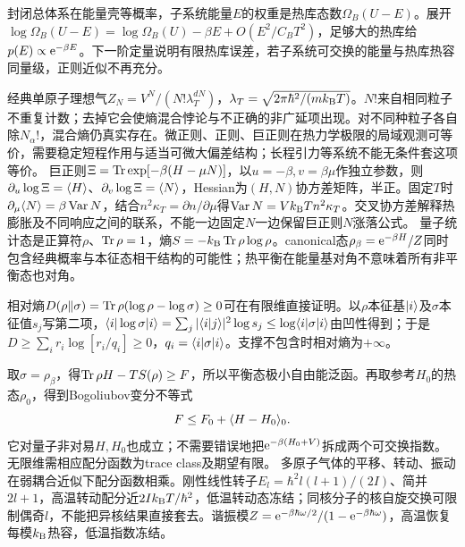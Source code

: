 \label{ch:ensemble}
封闭总体系在能量壳等概率，子系统能量$E$的权重是热库态数$\Omega_B(U-E)$。展开$\log\Omega_B(U-E)=\log\Omega_B(U)-\beta E+O(E^2/C_BT^2)$，足够大的热库给$p(E)\propto\mathrm e^{-\beta E}$。下一阶定量说明有限热库误差，若子系统可交换的能量与热库热容同量级，正则近似不再充分。

经典单原子理想气$Z_N=V^N/(N!\lambda_T^{dN})$，$\lambda_T=\sqrt{2\pi\hbar^2/(mk_{\mathrm B} T)}$。$N!$来自相同粒子不重复计数；去掉它会使熵混合悖论与不正确的非广延项出现。对不同种粒子各自除$N_\alpha!$，混合熵仍真实存在。微正则、正则、巨正则在热力学极限的局域观测可等价，需要稳定短程作用与适当可微大偏差结构；长程引力等系统不能无条件套这项等价。
巨正则$\Xi=\operatorname{Tr}\exp[-\beta(H-\mu N)]$，以$u=-\beta,v=\beta\mu$作独立参数，则$\partial_u\log\Xi=\langle H\rangle$、$\partial_v\log\Xi=\langle N\rangle$，Hessian为$(H,N)$协方差矩阵，半正。固定$T$时$\partial_\mu\langle N\rangle=\beta\operatorname{Var}N$，结合$n^2\kappa_T=\partial n/\partial\mu$得$\operatorname{Var}N=Vk_{\mathrm B} T n^2\kappa_T$。交叉协方差解释热膨胀及不同响应之间的联系，不能一边固定$N$一边保留巨正则$N$涨落公式。
量子统计态是正算符$\rho$、$\operatorname{Tr}\rho=1$，熵$S=-k_{\mathrm B}\operatorname{Tr}\rho\log\rho$。canonical态$\rho_\beta=\mathrm e^{-\beta H}/Z$同时包含经典概率与本征态相干结构的可能性；热平衡在能量基对角不意味着所有非平衡态也对角。

相对熵$D(\rho\Vert\sigma)=\operatorname{Tr}\rho(\log\rho-\log\sigma)\ge0$可在有限维直接证明。以$\rho$本征基$\lvert i\rangle$及$\sigma$本征值$s_j$写第二项，$\langle i|\log\sigma|i\rangle=\sum_j|\langle i|j\rangle|^2\log s_j\le\log\langle i|\sigma|i\rangle$由凹性得到；于是$D\ge\sum_ir_i\log[r_i/q_i]\ge0$，$q_i=\langle i|\sigma|i\rangle$。支撑不包含时相对熵为$+\infty$。

取$\sigma=\rho_\beta$，得$\operatorname{Tr}\rho H-TS(\rho)\ge F$，所以平衡态极小自由能泛函。再取参考$H_0$的热态$\rho_0$，得到Bogoliubov变分不等式
\begin{equation}
F\le F_0+\langle H-H_0\rangle_0.
\end{equation}
它对量子非对易$H,H_0$也成立；不需要错误地把$\mathrm e^{-\beta(H_0+V)}$拆成两个可交换指数。无限维需相应配分函数为trace class及期望有限。
多原子气体的平移、转动、振动在弱耦合近似下配分函数相乘。刚性线性转子$E_l=\hbar^2l(l+1)/(2I)$、简并$2l+1$，高温转动配分近$2Ik_{\mathrm B} T/\hbar^2$，低温转动态冻结；同核分子的核自旋交换可限制偶奇$l$，不能把异核结果直接套去。谐振模$Z=\mathrm e^{-\beta\hbar\omega/2}/(1-\mathrm e^{-\beta\hbar\omega})$，高温恢复每模$k_{\mathrm B}$热容，低温指数冻结。

